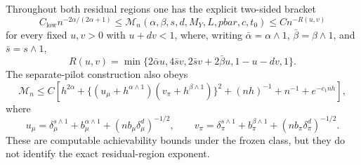 Throughout both residual regions one has the explicit two-sided bracket
\[
C_{\mathrm{low}}n^{-2\alpha/(2\alpha+1)}
\le \mathcal M_n(\alpha,\beta,s,d,M_Y,L,pbar,c,t_0)
\le C n^{-R(u,v)}
\]
for every fixed \(u,v>0\) with \(u+dv<1\), where, writing \(\bar\alpha=\alpha\wedge1\), \(\bar\beta=\beta\wedge1\), and \(\bar s=s\wedge1\),
\[
R(u,v)=\min\{2\bar\alpha u,4\bar s v,2\bar s v+2\bar\beta u,1-u-dv,1\}.
\]
The separate-pilot construction also obeys
\[
\mathcal M_n\le C\left[h^{2\alpha}+\{(u_\mu+h^{\alpha\wedge1})(v_\pi+h^{\beta\wedge1})\}^2+(nh)^{-1}+n^{-1}+e^{-c_1nh}\right],
\]
where
\[
u_\mu=\delta_\mu^{s\wedge1}+b_\mu^{\alpha\wedge1}+(nb_\mu\delta_\mu^d)^{-1/2},
\qquad
v_\pi=\delta_\pi^{s\wedge1}+b_\pi^{\beta\wedge1}+(nb_\pi\delta_\pi^d)^{-1/2}.
\]
These are computable achievability bounds under the frozen class, but they do not identify the exact residual-region exponent.